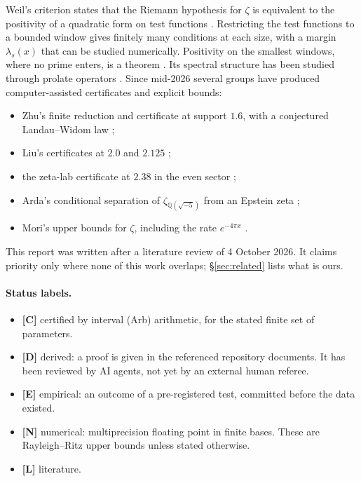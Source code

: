 \documentclass[11pt]{article}
\theoremstyle{remark}
\newcommand{\tagC}{\textbf{[C]}}
\newcommand{\tagD}{\textbf{[D]}}
\newcommand{\tagE}{\textbf{[E]}}
\newcommand{\tagN}{\textbf{[N]}}
\newcommand{\tagL}{\textbf{[L]}}
\begin{document}
Weil's criterion states that the Riemann hypothesis for $\zeta$ is equivalent to the positivity of a quadratic form on test functions \cite{weil52,bombieri00,yoshida92}. Restricting the test functions to a bounded window gives finitely many conditions at each size, with a margin $\lambda_s(x)$ that can be studied numerically. Positivity on the smallest windows, where no prime enters, is a theorem \cite{cc21}. Its spectral structure has been studied through prolate operators \cite{cc23,ccm24,ccm25,connes26}. Since mid-2026 several groups have produced computer-assisted certificates and explicit bounds:
\begin{itemize}
\item Zhu's finite reduction and certificate at support $1.6$, with a conjectured Landau--Widom law \cite{zhu26};
\item Liu's certificates at $2.0$ and $2.125$ \cite{liu26};
\item the zeta-lab certificate at $2.38$ in the even sector \cite{zetalab258};
\item Arda's conditional separation of $\zeta_{\mathbb Q(\sqrt{-5})}$ from an Epstein zeta \cite{arda631};
\item Mori's upper bounds for $\zeta$, including the rate $e^{-4\pi x}$ \cite{mori26a,mori26b,mori26c,mori26d}.
\end{itemize}
This report was written after a literature review of 4 October 2026. It claims priority only where none of this work overlaps; \S\ref{sec:related} lists what is ours.

\paragraph{Status labels.}
\begin{itemize}
\item \tagC{} certified by interval (Arb) arithmetic, for the stated finite set of parameters.
\item \tagD{} derived: a proof is given in the referenced repository documents. It has been reviewed by AI agents, not yet by an external human referee.
\item \tagE{} empirical: an outcome of a pre-registered test, committed before the data existed.
\item \tagN{} numerical: multiprecision floating point in finite bases. These are Rayleigh--Ritz upper bounds unless stated otherwise.
\item \tagL{} literature.
\end{itemize}
\end{document}

